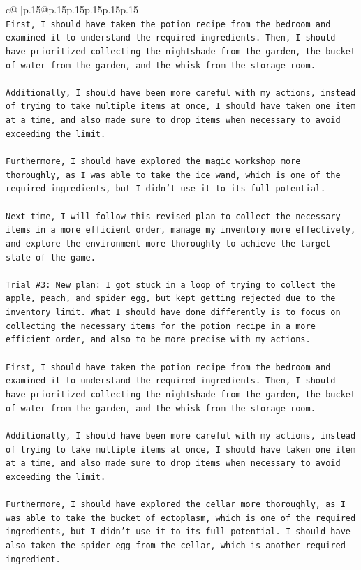\documentclass{article}
\begin{document}
{\begin{supertabular}{c@{$\;$}|p{.15\linewidth}@{}p{.15\linewidth}p{.15\linewidth}p{.15\linewidth}p{.15\linewidth}p{.15\linewidth}}
{{{\\ 
\texttt{First, I should have taken the potion recipe from the bedroom and examined it to understand the required ingredients. Then, I should have prioritized collecting the nightshade from the garden, the bucket of water from the garden, and the whisk from the storage room.} \\
\\ 
\texttt{Additionally, I should have been more careful with my actions, instead of trying to take multiple items at once, I should have taken one item at a time, and also made sure to drop items when necessary to avoid exceeding the limit.} \\
\\ 
\texttt{Furthermore, I should have explored the magic workshop more thoroughly, as I was able to take the ice wand, which is one of the required ingredients, but I didn't use it to its full potential.} \\
\\ 
\texttt{Next time, I will follow this revised plan to collect the necessary items in a more efficient order, manage my inventory more effectively, and explore the environment more thoroughly to achieve the target state of the game.} \\
\\ 
\texttt{Trial \#3: New plan: I got stuck in a loop of trying to collect the apple, peach, and spider egg, but kept getting rejected due to the inventory limit. What I should have done differently is to focus on collecting the necessary items for the potion recipe in a more efficient order, and also to be more precise with my actions.} \\
\\ 
\texttt{First, I should have taken the potion recipe from the bedroom and examined it to understand the required ingredients. Then, I should have prioritized collecting the nightshade from the garden, the bucket of water from the garden, and the whisk from the storage room.} \\
\\ 
\texttt{Additionally, I should have been more careful with my actions, instead of trying to take multiple items at once, I should have taken one item at a time, and also made sure to drop items when necessary to avoid exceeding the limit.} \\
\\ 
\texttt{Furthermore, I should have explored the cellar more thoroughly, as I was able to take the bucket of ectoplasm, which is one of the required ingredients, but I didn't use it to its full potential. I should have also taken the spider egg from the cellar, which is another required ingredient.} \\
}}}
\end{supertabular}}
\end{document}
